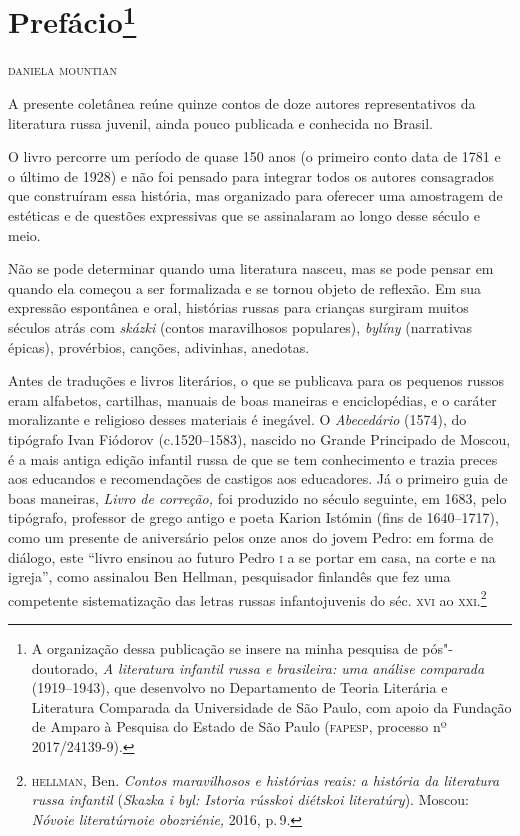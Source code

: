\pagestyle{plain}
\chapter{Prefácio\footnote{A \label{part0}
  organização dessa publicação se insere na minha pesquisa de
  pós"-doutorado, \emph{A literatura infantil russa e brasileira: uma
  análise comparada} (1919--1943), que desenvolvo no Departamento
  de Teoria Literária e Literatura Comparada da Universidade de São
  Paulo, com apoio da Fundação de Amparo à Pesquisa do Estado de São Paulo (\textsc{fapesp}, processo nº 2017/24139-9).}} \label{part0}

\begingroup\small
\begin{flushright}
\hfill\textsc{daniela mountian}
\end{flushright}


\noindent{}A presente coletânea reúne quinze contos de doze autores representativos da
literatura russa juvenil, ainda pouco publicada e conhecida
no Brasil.

O livro percorre um período de quase 150 anos (o primeiro conto data de
1781 e o último de 1928) e não foi pensado para integrar todos os
autores consagrados que construíram essa história, mas organizado para
oferecer uma amostragem de estéticas e de questões expressivas que se
assinalaram ao longo desse século e meio.

Não se pode determinar quando uma literatura nasceu, mas se pode pensar
em quando ela começou a ser formalizada e se tornou objeto de reflexão.
Em sua expressão espontânea e oral, histórias russas para crianças
surgiram muitos séculos atrás com \emph{skázki} (contos maravilhosos
populares), \emph{bylíny} (narrativas épicas), provérbios,
canções, adivinhas, anedotas.

Antes de traduções e livros literários, o que se publicava para os
pequenos russos eram alfabetos, cartilhas, manuais de boas maneiras e
enciclopédias, e o caráter moralizante e religioso desses materiais é
inegável. O \emph{Abecedário} (1574), do tipógrafo Ivan Fiódorov
(c.1520--1583), nascido no Grande Principado de Moscou, é a mais antiga
edição infantil russa de que se tem conhecimento e trazia preces aos
educandos e recomendações de castigos aos educadores. Já o primeiro guia
de boas maneiras, \emph{Livro de correção,} foi produzido no século
seguinte, em 1683, pelo tipógrafo, professor de grego antigo e poeta
Karion Istómin (fins de 1640--1717), como um presente de aniversário
pelos onze anos do jovem Pedro: em forma de diálogo, este ``livro
ensinou ao futuro Pedro \textsc{i} a se portar em casa, na corte e na igreja'',
como assinalou Ben Hellman, pesquisador finlandês que fez uma competente
sistematização das letras russas infantojuvenis do séc. \textsc{xvi} ao
\textsc{xxi}.\footnote{\textsc{hellman}, Ben. \emph{Contos maravilhosos e histórias reais:
  a história da literatura russa infantil} (\emph{Skazka i byl: Istoria
  rússkoi diétskoi literatúry}). Moscou: \emph{Nóvoie
  literatúrnoie obozriénie,} 2016, p.\,9.}

